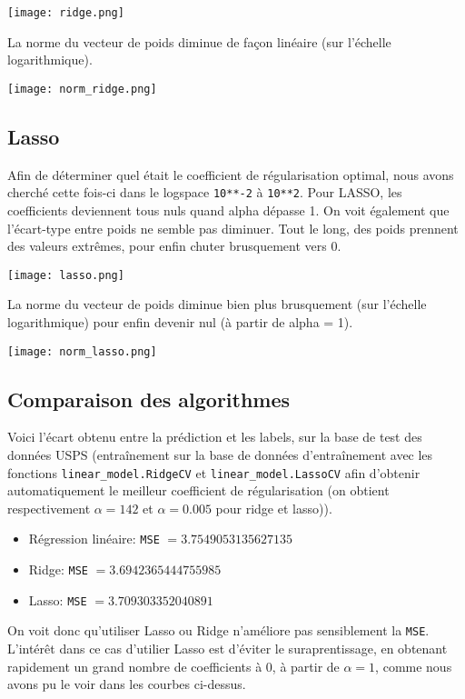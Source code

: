 \documentclass[a4paper, 10pt]{article}
\begin{document}
\texttt{[image: ridge.png]}

La norme du vecteur de poids diminue de façon linéaire (sur l'échelle logarithmique).

\texttt{[image: norm\_ridge.png]}

\subsection*{Lasso}

Afin de déterminer quel était le coefficient de régularisation optimal, nous avons cherché cette fois-ci dans le logspace \verb|10**-2| à \verb|10**2|. Pour LASSO, les coefficients deviennent tous nuls quand alpha dépasse 1. On voit également que l'écart-type entre poids ne semble pas diminuer. Tout le long, des poids prennent des valeurs extrêmes, pour enfin chuter brusquement vers 0.

\texttt{[image: lasso.png]}

La norme du vecteur de poids diminue bien plus brusquement (sur l'échelle logarithmique) pour enfin devenir nul (à partir de alpha = 1).

\texttt{[image: norm\_lasso.png]}

\subsection*{Comparaison des algorithmes}

Voici l'écart obtenu entre la prédiction et les labels, sur la base de test des données USPS (entraînement sur la base de données d'entraînement avec les fonctions  \verb|linear_model.RidgeCV| et  \verb|linear_model.LassoCV| afin d'obtenir automatiquement le meilleur coefficient de régularisation (on obtient respectivement $\alpha =142$ et $\alpha =0.005$ pour ridge et lasso)).

\begin{itemize}
    \item Régression linéaire: \verb|MSE| $= 3.7549053135627135$
 \item Ridge: \verb|MSE| $= 3.6942365444755985$ 
\item Lasso: \verb|MSE| $= 3.709303352040891$
\end{itemize}

On voit donc qu'utiliser Lasso ou Ridge n'améliore pas sensiblement la \verb|MSE|. L'intérêt dans ce cas d'utilier Lasso est d'éviter le suraprentissage, en obtenant rapidement un grand nombre de coefficients à 0, à partir de $\alpha = 1$, comme nous avons pu le voir dans les courbes ci-dessus.
\end{document}
